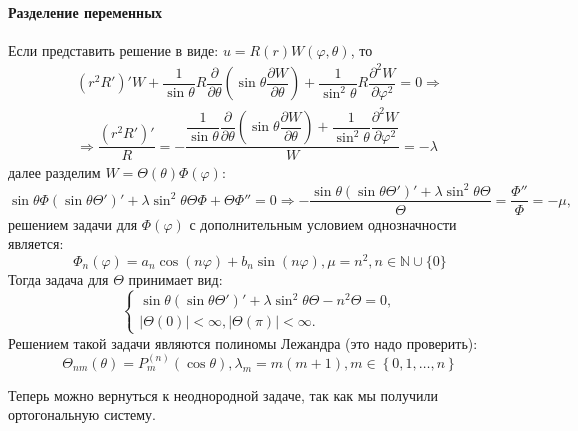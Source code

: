 \paragraph{Разделение переменных}

Если представить решение в виде: $u = R(r) W(\varphi, \theta)$, то
\begin{multline*}
  \left( r^2 R' \right)' W
  + \dfrac{1}{\sin \theta} R \dfrac{\partial }{\partial \theta} \left( \sin\theta \dfrac{\partial W}{\partial \theta} \right) 
  + \dfrac{1}{\sin^2 \theta} R \dfrac{\partial^2 W}{\partial \varphi^2} = 0
  \Rightarrow \\
  \Rightarrow
  \dfrac{(r^2 R')'}{R}
  = - \dfrac
    {\dfrac{1}{\sin \theta} \dfrac{\partial }{\partial \theta} \left( \sin\theta \dfrac{\partial W}{\partial \theta} \right) + \dfrac{1}{\sin^2 \theta} \dfrac{\partial^2 W}{\partial \varphi^2}}
    {W} = - \lambda
\end{multline*}
далее разделим $W = \Theta(\theta) \Phi(\varphi)$:
\[
  \sin\theta \Phi (\sin\theta \Theta')' + \lambda \sin^2\theta \Theta\Phi
  + \Theta \Phi'' = 0
  \Rightarrow
  - \dfrac{\sin\theta (\sin\theta \Theta')' + \lambda \sin^2\theta \Theta}{\Theta}
  = \dfrac{\Phi''}{\Phi} = -\mu,
\]
решением задачи для $\Phi(\varphi)$ с дополнительным условием однозначности является:
\[
  \Phi_n (\varphi) = a_n \cos(n \varphi) + b_n \sin(n \varphi), \mu = n^2,
  n \in \mathbb{N} \cup \{0\}
\]
Тогда задача для $\Theta$ принимает вид:
\[
  \begin{cases}  
    \sin\theta (\sin\theta \Theta')' + \lambda \sin^2\theta \Theta - n^2 \Theta = 0, \\
    |\Theta(0)| < \infty, |\Theta (\pi)| < \infty.
  \end{cases}
\]
Решением такой задачи являются полиномы Лежандра (это надо проверить):
\[
  \Theta_{nm} (\theta) = P_{m}^{(n)} (\cos\theta),
  \lambda_m = m(m+1), m \in \left\{ 0, 1, \dots, n \right\} 
\]

Теперь можно вернуться к неоднородной задаче, так как мы получили ортогональную систему.
